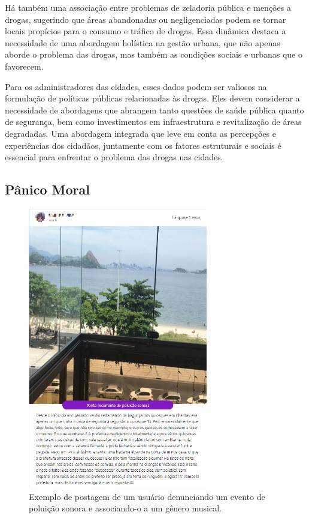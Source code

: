 Há também uma associação entre problemas de zeladoria pública e menções a drogas, sugerindo que áreas abandonadas ou negligenciadas podem se tornar locais propícios para o consumo e tráfico de drogas. Essa dinâmica destaca a necessidade de uma abordagem holística na gestão urbana, que não apenas aborde o problema das drogas, mas também as condições sociais e urbanas que o favorecem.

Para os administradores das cidades, esses dados podem ser valiosos na formulação de políticas públicas relacionadas às drogas. Eles devem considerar a necessidade de abordagens que abrangem tanto questões de saúde pública quanto de segurança, bem como investimentos em infraestrutura e revitalização de áreas degradadas. Uma abordagem integrada que leve em conta as percepções e experiências dos cidadãos, juntamente com os fatores estruturais e sociais é essencial para enfrentar o problema das drogas nas cidades.

\subsection{Pânico Moral}
\label{sec:eventos_populares_moral_panic}

\begin{figure}[htb]
	\centering
	\includegraphics[width=0.7\textwidth]{images/colab_posts_karen.png}
	\caption{Exemplo de postagem de um usuário denunciando um evento de poluição sonora e associando-o a um gênero musical.}
	\label{fig:colab_posts_karen}
\end{figure}

